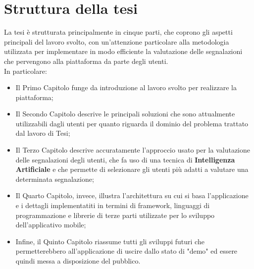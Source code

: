         \newpage

\section{Struttura della tesi}
        La tesi è strutturata principalmente in cinque parti, che coprono gli aspetti principali del lavoro svolto, con un'attenzione particolare alla metodologia utilizzata per implementare in modo efficiente la valutazione delle segnalazioni che pervengono alla piattaforma da parte degli utenti. \\
        In particolare:
        \begin{itemize}
            \item Il Primo Capitolo funge da introduzione al lavoro svolto per realizzare la piattaforma;
            \item Il Secondo Capitolo descrive le principali soluzioni che sono attualmente utilizzabili dagli utenti per quanto riguarda il dominio del problema trattato dal lavoro di Tesi;
            \item Il Terzo Capitolo descrive accuratamente l'approccio usato per la valutazione delle segnalazioni degli utenti, che fa uso di una tecnica di \textbf{Intelligenza Artificiale} e che permette di selezionare gli utenti più adatti a valutare una determinata segnalazione;
            \item Il Quarto Capitolo, invece, illustra l'architettura su cui si basa l'applicazione e i dettagli implementatiti in termini di framework, linguaggi di programmazione e librerie di terze parti utilizzate per lo sviluppo dell'applicativo mobile;
            \item Infine, il Quinto Capitolo riassume tutti gli sviluppi futuri che permetterebbero all'applicazione di uscire dallo stato di "demo" ed essere quindi messa a disposizione del pubblico.
        \end{itemize}
